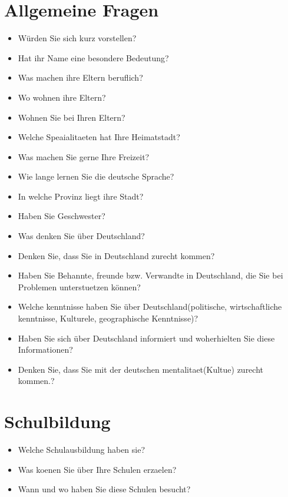 \documentclass[b5paper, twoside]{ctexbook}
\begin{document}
\section{Allgemeine Fragen}
\begin{itemize}
  \item W\"urden Sie sich kurz vorstellen?
  \item Hat ihr Name eine besondere Bedeutung?
  \item Was machen ihre Eltern beruflich?
  \item Wo wohnen ihre Eltern?
  \item Wohnen Sie bei Ihren Eltern?
  \item Welche Speaialitaeten hat Ihre Heimatstadt?
  \item Was machen Sie gerne Ihre Freizeit?
  \item Wie lange lernen Sie die deutsche Sprache?
  \item In welche Provinz liegt ihre Stadt?
  \item Haben Sie Geschwester?
  \item Was denken Sie \"uber Deutschland?
  \item Denken Sie, dass Sie in Deutschland zurecht kommen?
  \item Haben Sie Behannte, freunde bzw. Verwandte in Deutschland, die Sie bei Problemen unterstuetzen k\"onnen?
  \item Welche kenntnisse haben Sie \"uber Deutschland(politische, wirtschaftliche kenntnisse, Kulturele, geographische Kenntnisse)?
  \item Haben Sie sich \"uber Deutschland informiert und woherhielten Sie diese Informationen?
  \item Denken Sie, dass Sie mit der deutschen mentalitaet(Kultue) zurecht kommen.?
\end{itemize}
\section{Schulbildung}
\begin{itemize}
  \item Welche Schulausbildung haben sie?
  \item Was koenen Sie \"uber Ihre Schulen erzaelen?
  \item Wann und wo haben Sie diese Schulen besucht?
\end{itemize}
\end{document}
